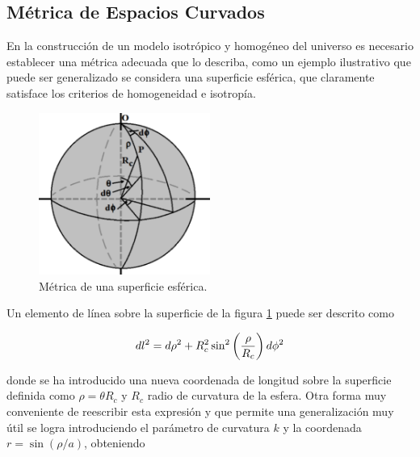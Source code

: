 	\subsection{Métrica de Espacios Curvados}
	\label{subsec:MetricOFCurvedSpaces}
	

En la construcción de un modelo isotrópico y homogéneo del universo es
necesario establecer una métrica adecuada que lo describa, como un ejemplo
ilustrativo que puede ser generalizado se considera una superficie esférica, 
que claramente satisface los criterios de homogeneidad e isotropía.


\begin{figure}[htbp]
	\centering
	\includegraphics[width=0.5\textwidth]
	{./figures/2_theoretical_framework/2D_Sphere.png}
	
	\caption{\small{Métrica de una superficie esférica.}}
	
	\label{fig:2sphere}
\end{figure}



Un elemento de línea sobre la superficie de la figura \ref{fig:2sphere} 
puede ser descrito como


\[ dl^2 = d\rho^2 + R_c^2 \sin^2 \left(  \frac{\rho}{R_c} \right)d\phi^2 \]


donde se ha introducido una nueva coordenada de longitud sobre la superficie
definida como $\rho = \theta R_c$ y $R_c$ radio de curvatura de la esfera. 
Otra forma muy conveniente de reescribir esta expresión y que permite una
generalización muy útil se logra introduciendo el parámetro de curvatura $k$ 
y la coordenada $r = \sin (\rho/a)$, obteniendo


